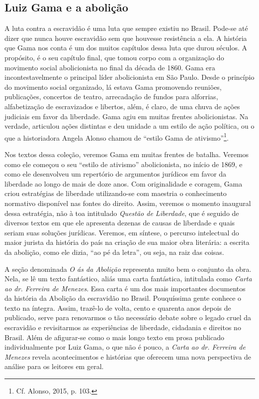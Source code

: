 \subsection{Luiz Gama e a abolição}

A luta contra a escravidão é uma luta que sempre existiu no Brasil.
Pode-se até dizer que nunca houve escravidão sem que houvesse
resistência a ela. A história que Gama nos conta é um dos muitos
capítulos dessa luta que durou séculos. A propósito, é o seu capítulo
final, que tomou corpo com a organização do movimento social
abolicionista no final da década de 1860. Gama era incontestavelmente o
principal líder abolicionista em São Paulo. Desde o princípio do
movimento social organizado, lá estava Gama promovendo reuniões,
publicações, concertos de teatro, arrecadação de fundos para alforrias,
alfabetização de escravizados e libertos, além, é claro, de uma chuva de
ações judiciais em favor da liberdade. Gama agiu em muitas frentes
abolicionistas. Na verdade, articulou ações distintas e deu unidade a um
estilo de ação política, ou o que a historiadora Angela Alonso chamou de
``estilo Gama de ativismo''\footnote{Cf. Alonso, 2015, p. 103.}.

Nos textos dessa coleção, veremos Gama em muitas frentes de batalha.
Veremos como ele começou o seu ``estilo de ativismo'' abolicionista, no
início de 1869, e como ele desenvolveu um repertório de argumentos
jurídicos em favor da liberdade ao longo de mais de doze anos. Com
originalidade e coragem, Gama criou estratégias de liberdade
utilizando-se com maestria o conhecimento normativo disponível nas
fontes do direito. Assim, veremos o momento inaugural dessa estratégia,
não à toa intitulado \emph{Questão de Liberdade}, que é seguido de
diversos textos em que ele apresenta dezenas de causas de liberdade e
quais seriam suas soluções jurídicas. Veremos, em síntese, o percurso
intelectual do maior jurista da história do país na criação de sua maior
obra literária: a escrita da abolição, como ele dizia, ``ao pé da letra'',
ou seja, na raiz das coisas.

A seção denominada \emph{O ás da Abolição} representa muito bem o
conjunto da obra. Nela, se lê um texto fantástico, aliás uma carta
fantástica, intitulada como \emph{Carta ao dr. Ferreira de Menezes}.
Essa carta é um dos mais importantes documentos da história da Abolição
da escravidão no Brasil. Pouquíssima gente conhece o texto na íntegra.
Assim, trazê-lo de volta, cento e quarenta anos depois de publicado,
serve para renovarmos o tão necessário debate sobre o legado cruel da
escravidão e revisitarmos as experiências de liberdade, cidadania e
direitos no Brasil. Além de afigurar-se como o mais longo texto em prosa
publicado individualmente por Luiz Gama, o que não é pouco, a
\emph{Carta ao dr. Ferreira de Menezes} revela acontecimentos e
histórias que oferecem uma nova perspectiva de análise para os leitores
em geral.

